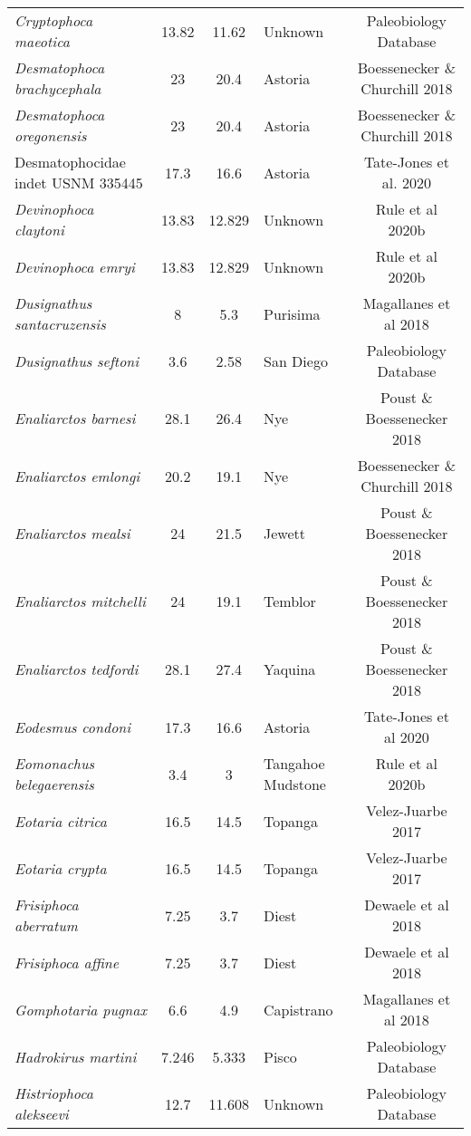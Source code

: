 \begin{longtable}{p{}cclc}
\textit{Cryptophoca maeotica} & 	13.82	&	11.62	&	Unknown	&	Paleobiology Database	\\
\textit{Desmatophoca brachycephala} & 	23	&	20.4	&	Astoria	&	Boessenecker \& Churchill 2018	\\
\textit{Desmatophoca oregonensis} & 	23	&	20.4	&	Astoria	&	Boessenecker \& Churchill 2018	\\
Desmatophocidae indet USNM 335445 & 	17.3	&	16.6	&	Astoria	&	Tate-Jones et al. 2020	\\
\textit{Devinophoca claytoni} & 	13.83	&	12.829	&	Unknown	&	Rule et al 2020b	\\
\textit{Devinophoca emryi} & 	13.83	&	12.829	&	Unknown	&	Rule et al 2020b	\\
\textit{Dusignathus santacruzensis} & 	8	&	5.3	&	Purisima	&	Magallanes et al 2018	\\
\textit{Dusignathus seftoni} & 	3.6	&	2.58	&	San Diego	&	Paleobiology Database	\\
\textit{Enaliarctos barnesi} & 	28.1	&	26.4	&	Nye	&	Poust \& Boessenecker 2018	\\
\textit{Enaliarctos emlongi} & 	20.2	&	19.1	&	Nye	&	Boessenecker \& Churchill 2018	\\
\textit{Enaliarctos mealsi} & 	24	&	21.5	&	Jewett	&	Poust \& Boessenecker 2018	\\
\textit{Enaliarctos mitchelli} & 	24	&	19.1	&	Temblor	&	Poust \& Boessenecker 2018	\\
\textit{Enaliarctos tedfordi} & 	28.1	&	27.4	&	Yaquina	&	Poust \& Boessenecker 2018	\\
\textit{Eodesmus condoni} & 	17.3	&	16.6	&	Astoria	&	Tate-Jones et al 2020	\\
\textit{Eomonachus belegaerensis} & 	3.4	&	3	&	Tangahoe Mudstone	&	Rule et al 2020b	\\
\textit{Eotaria citrica} & 	16.5	&	14.5	&	Topanga	&	Velez-Juarbe 2017	\\
\textit{Eotaria crypta} & 	16.5	&	14.5	&	Topanga	&	Velez-Juarbe 2017	\\
\textit{Frisiphoca aberratum} & 	7.25	&	3.7	&	Diest	&	Dewaele et al 2018	\\
\textit{Frisiphoca affine} & 	7.25	&	3.7	&	Diest	&	Dewaele et al 2018	\\
\textit{Gomphotaria pugnax} & 	6.6	&	4.9	&	Capistrano	&	Magallanes et al 2018	\\
\textit{Hadrokirus martini} & 	7.246	&	5.333	&	Pisco	&	Paleobiology Database	\\
\textit{Histriophoca alekseevi} & 	12.7	&	11.608	&	Unknown	&	Paleobiology Database	\\

\end{longtable}
